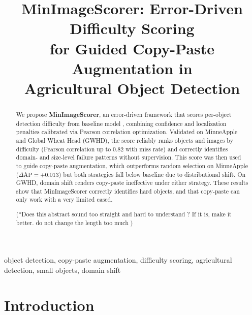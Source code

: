 \documentclass[conference]{IEEEtran}
\begin{document}
\title{MinImageScorer: Error-Driven Difficulty Scoring\\
for Guided Copy-Paste Augmentation in\\
Agricultural Object Detection}

\author{
}

\maketitle

\begin{abstract}
We propose \textbf{MinImageScorer}, an error-driven framework that
scores per-object detection difficulty from baseline model ,
combining confidence and localization penalties calibrated via
Pearson correlation optimization. Validated on MinneApple and Global
Wheat Head (GWHD), the score reliably ranks objects and images by
difficulty (Pearson correlation up to $0.82$ with miss rate) and correctly
identifies domain- and size-level failure patterns without supervision. 
This score was then used to guide copy-paste augmentation,
which outperforms random selection on MinneApple
($\Delta\mathrm{AP}{=}{+}0.013$) but both strategies fall below
baseline due to distributional shift. On GWHD, domain shift renders
copy-paste ineffective under either strategy. These results show
that MinImageScorer correctly identifies hard objects, and that
copy-paste can only work with a very limited cased.

(*Does this abstract sound too straight and hard to understand ?
If it is, make it better. do not change the length too much
)
\end{abstract}

\begin{IEEEkeywords}
object detection, copy-paste augmentation, difficulty scoring,
agricultural detection, small objects, domain shift
\end{IEEEkeywords}

\section{Introduction}
\end{document}
